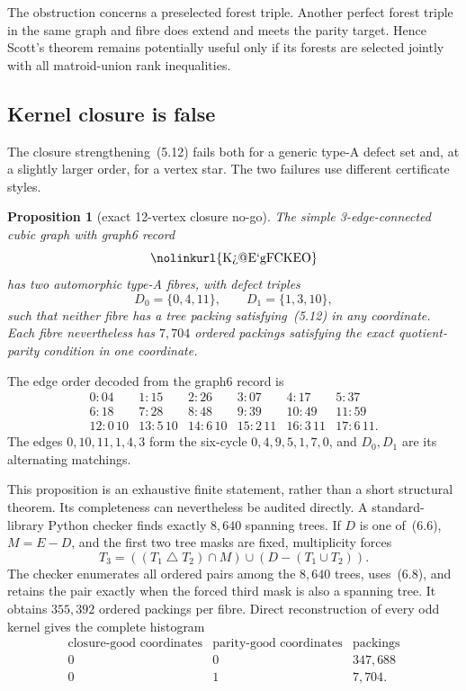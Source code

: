 \documentclass[11pt]{article}
\newtheorem{proposition}[theorem]{Proposition}
\theoremstyle{definition}
\theoremstyle{remark}
\newcommand{\symdiff}{\mathbin{\triangle}}
\newcommand{\1}{\mathbf 1}
\begin{document}
The obstruction concerns a preselected forest triple.  Another perfect
forest triple in the same graph and fibre does extend and meets the parity
target.  Hence Scott's theorem remains potentially useful only if its
forests are selected jointly with all matroid-union rank inequalities.

\subsection{Kernel closure is false}
\label{sec:closure-nogo}

The closure strengthening~(5.12) fails both for a generic type-A defect
set and, at a slightly larger order, for a vertex star.  The two failures
use different certificate styles.

\begin{proposition}[exact 12-vertex closure no-go]
\label{prop:closure-nogo}
The simple 3-edge-connected cubic graph with graph6 record
\[
 \text{\nolinkurl{K?`@E`gFCKEO}}
\]
has two automorphic type-A fibres, with defect triples
\[
 D_0=\{0,4,11\},\qquad D_1=\{1,3,10\},                  \tag{6.6}
\]
such that neither fibre has a tree packing satisfying~(5.12) in any
coordinate.  Each fibre nevertheless has \(7{,}704\) ordered packings
satisfying the exact quotient-parity condition in one coordinate.
\end{proposition}

The edge order decoded from the graph6 record is
\[
\begin{array}{rrrrrr}
0:04&1:15&2:26&3:07&4:17&5:37\\
6:18&7:28&8:48&9:39&10:49&11:59\\
12:0\,10&13:5\,10&14:6\,10&15:2\,11&16:3\,11&17:6\,11.
\end{array}                                             \tag{6.7}
\]
The edges \(0,10,11,1,4,3\) form the six-cycle
\(0,4,9,5,1,7,0\), and \(D_0,D_1\) are its alternating matchings.

This proposition is an exhaustive finite statement, rather than a short
structural theorem.  Its completeness can nevertheless be audited
directly.  A standard-library Python checker finds exactly \(8{,}640\)
spanning trees.  If \(D\) is one of~(6.6), \(M=E-D\), and the first two
tree masks are fixed, multiplicity forces
\[
 T_3=((T_1\symdiff T_2)\cap M)\cup(D-(T_1\cup T_2)).     \tag{6.8}
\]
The checker enumerates all ordered pairs among the \(8{,}640\) trees,
uses~(6.8), and retains the pair exactly when the forced third mask is
also a spanning tree.  It obtains \(355{,}392\) ordered packings per
fibre.  Direct reconstruction of every odd kernel gives the complete
histogram
\[
\begin{array}{c|c|r}
\text{closure-good coordinates}&\text{parity-good coordinates}
 &\text{packings}\\ \hline
0&0&347{,}688\\
0&1&7{,}704.
\end{array}                                             \tag{6.9}
\]
\end{document}
